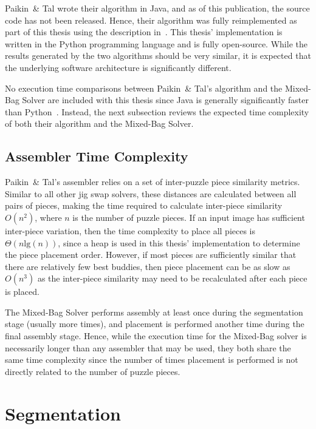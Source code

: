 Paikin~\& Tal wrote their algorithm in Java, and as of this publication, the source code has not been released.  Hence, their algorithm was fully reimplemented as part of this thesis using the description in~\cite{paikin2015}.  This thesis' implementation is written in the Python programming language and is fully open-source. While the results generated by the two algorithms should be very similar, it is expected that the underlying software architecture is significantly different. 

No execution time comparisons between Paikin~\& Tal's algorithm and the Mixed-Bag Solver are included with this thesis since Java is generally significantly faster than Python~\cite{pythonJavaComparison}.  Instead, the next subsection reviews the expected time complexity of both their algorithm and the Mixed-Bag Solver.

\subsection{Assembler Time Complexity}\label{sec:assemblerTimeComplexity}

Paikin~\& Tal's assembler relies on a set of inter-puzzle piece similarity metrics.  Similar to all other jig swap solvers, these distances are calculated between all pairs of pieces, making the time required to calculate inter-piece similarity $O(n^2)$, where $n$ is the number of puzzle pieces.  If an input image has sufficient inter-piece variation, then the time complexity to place all pieces is $\Theta(n \text{lg}(n))$, since a heap is used in this thesis' implementation to determine the piece placement order.  However, if most pieces are sufficiently similar that there are relatively few best buddies, then piece placement can be as slow as $O(n^3)$ as the inter-piece similarity may need to be recalculated after each piece is placed.

The Mixed-Bag Solver performs assembly at least once during the segmentation stage (usually more times), and placement is performed another time during the final assembly stage.  Hence, while the execution time for the Mixed-Bag solver is necessarily longer than any assembler that may be used, they both share the same time complexity since the number of times placement is performed is not directly related to the number of puzzle pieces.

\section{Segmentation}\label{sec:Segmentation}

